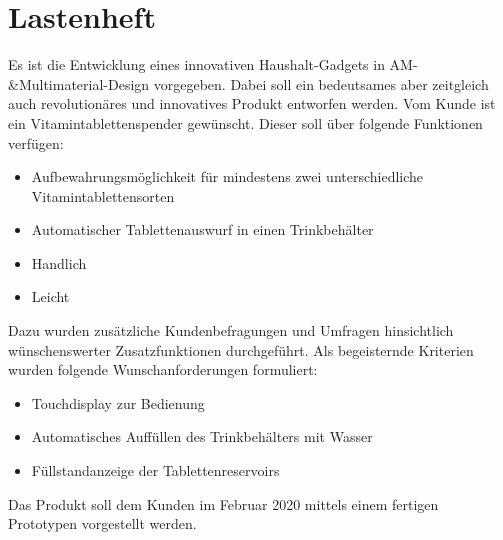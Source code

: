 
\chapter{Lastenheft}

Es ist die Entwicklung eines innovativen Haushalt-Gadgets in AM-\&Multimaterial-Design vorgegeben. Dabei soll ein bedeutsames aber zeitgleich auch revolutionäres und innovatives Produkt entworfen werden. Vom Kunde ist ein Vitamintablettenspender gewünscht. Dieser soll über folgende Funktionen verfügen:

\begin{itemize}
	\item Aufbewahrungsmöglichkeit für mindestens zwei unterschiedliche Vitamintablettensorten
	\item Automatischer Tablettenauswurf in einen Trinkbehälter
	\item Handlich
	\item Leicht
\end{itemize}

Dazu wurden zusätzliche Kundenbefragungen und Umfragen hinsichtlich wünschenswerter Zusatzfunktionen durchgeführt. Als begeisternde Kriterien wurden folgende Wunschanforderungen formuliert:

\begin{itemize}
	\item Touchdisplay zur Bedienung
	\item Automatisches Auffüllen des Trinkbehälters mit Wasser
	\item Füllstandanzeige der Tablettenreservoirs
\end{itemize}

Das Produkt soll dem Kunden im Februar 2020 mittels einem fertigen Prototypen vorgestellt werden.